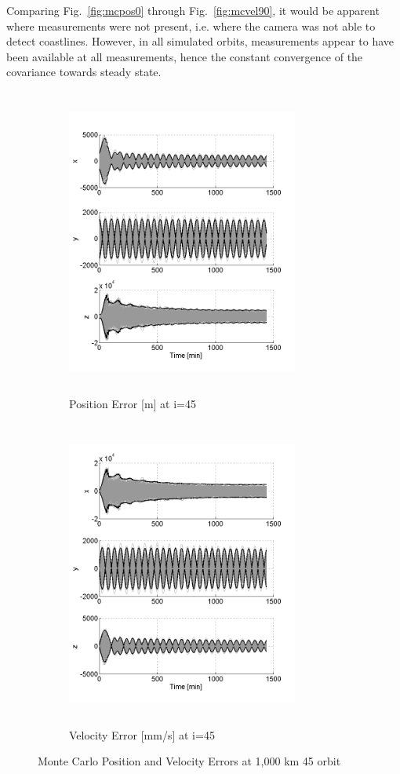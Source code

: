 \documentclass[]{aiaa-tc}%
\begin{document}
%
Comparing Fig.~\ref{fig:mcpos0} through Fig.~\ref{fig:mcvel90}, it would be apparent where measurements were not present, i.e. where the camera was not able to detect coastlines.  However, in all simulated orbits, measurements appear to have been available at all measurements, hence the constant convergence of the covariance towards steady state.  
\begin{figure}[h!]
\centering
\begin{subfigure}{.5\textwidth}
  \centering
  \includegraphics[height=4in,width=3in,keepaspectratio=false]{MC_pos45}
  \caption{Position Error [m] at i=45\degree}
  \label{fig:mcpos45}
\end{subfigure}%
\begin{subfigure}{.5\textwidth} 
  \centering
  \includegraphics[height=4in,width=3in,keepaspectratio=false]{MC_vel45}
  \caption{Velocity Error [mm/s] at i=45\degree}
  \label{fig:coastline}
\end{subfigure}
\caption{Monte Carlo Position and Velocity Errors at 1,000 km 45 \degree orbit}
\label{fig:mcvel45}
\end{figure}
\end{document}
